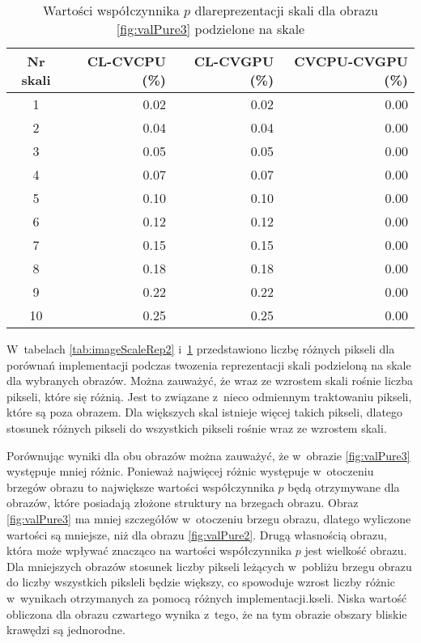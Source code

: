 \begin{center}
\begin{table}
\centering
\caption{Wartości współczynnika $ p $ dlareprezentacji skali dla obrazu \ref{fig:valPure3} podzielone na skale}
\label{tab:imageScaleRep3}
\begin{tabular}{|c|r|r|r|}
 \hline
Nr skali & CL-CVCPU (\%) & CL-CVGPU (\%) & CVCPU-CVGPU (\%) \\ \hline
1        & 0.02     & 0.02     & 0.00        \\ \hline
2        & 0.04     & 0.04     & 0.00        \\ \hline
3        & 0.05     & 0.05     & 0.00        \\ \hline
4        & 0.07     & 0.07     & 0.00        \\ \hline
5        & 0.10     & 0.10     & 0.00        \\ \hline
6        & 0.12     & 0.12     & 0.00        \\ \hline
7        & 0.15     & 0.15     & 0.00        \\ \hline
8        & 0.18     & 0.18     & 0.00        \\ \hline
9        & 0.22     & 0.22     & 0.00        \\ \hline
10       & 0.25     & 0.25     & 0.00        \\ \hline
\end{tabular}
\end{table}
\end{center}

W~tabelach \ref{tab:imageScaleRep2} i~\ref{tab:imageScaleRep3} przedstawiono liczbę różnych pikseli dla porównań implementacji podczas twozenia reprezentacji skali podzieloną na skale dla wybranych obrazów. Można zauważyć, że wraz ze wzrostem skali rośnie liczba pikseli, które się różnią. Jest to związane z~nieco odmiennym traktowaniu pikseli, które są poza obrazem. Dla większych skal istnieje więcej takich pikseli, dlatego stosunek różnych pikseli do wszystkich pikseli rośnie wraz ze wzrostem skali.

Porównując wyniki dla obu obrazów można zauważyć, że w~obrazie \ref{fig:valPure3} występuje mniej różnic. Ponieważ najwięcej różnic występuje w~otoczeniu brzegów obrazu to największe wartości współczynnika $ p $ będą otrzymywane dla obrazów, które posiadają złożone struktury na brzegach obrazu. Obraz \ref{fig:valPure3} ma mniej szczegółów w~otoczeniu brzegu obrazu, dlatego wyliczone wartości są mniejsze, niż dla obrazu \ref{fig:valPure2}. Drugą własnością obrazu, która może wpływać znacząco na wartości współczynnika $ p $ jest wielkość obrazu. Dla mniejszych obrazów stosunek liczby pikseli leżących w~pobliżu brzegu obrazu do liczby wszystkich piksleli będzie większy, co spowoduje wzrost liczby różnic w~wynikach otrzymanych za pomocą różnych implementacji.kseli. Niska wartość obliczona dla obrazu czwartego wynika z~tego, że na tym obrazie obszary bliskie krawędzi są jednorodne.

